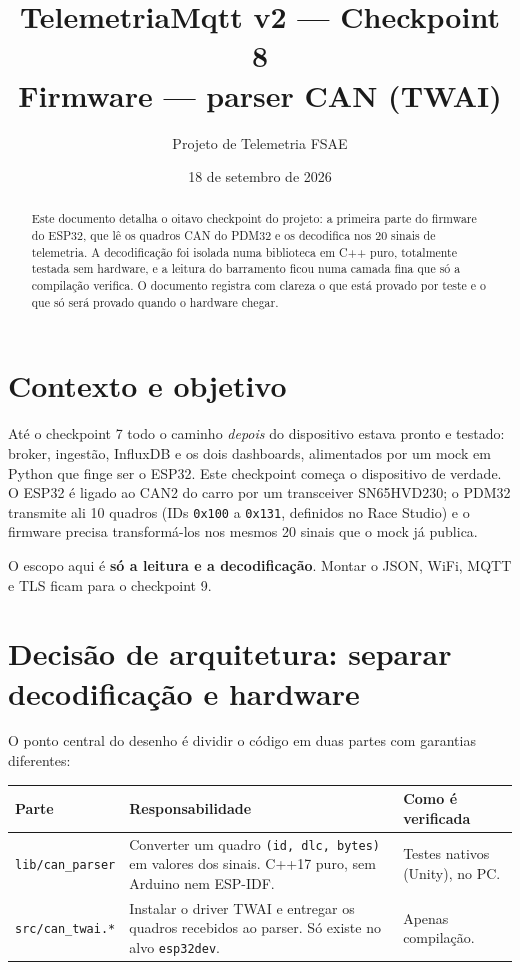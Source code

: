 \documentclass[11pt,a4paper]{article}
\title{\textbf{TelemetriaMqtt v2 --- Checkpoint 8} \\[4pt]
\large Firmware --- parser CAN (TWAI)}
\author{Projeto de Telemetria FSAE}
\date{18 de setembro de 2026}
\begin{document}
\maketitle

\begin{abstract}
\noindent Este documento detalha o oitavo checkpoint do projeto: a primeira parte do firmware do ESP32, que lê os quadros CAN do PDM32 e os decodifica nos 20 sinais de telemetria. A decodificação foi isolada numa biblioteca em C++ puro, totalmente testada sem hardware, e a leitura do barramento ficou numa camada fina que só a compilação verifica. O documento registra com clareza o que está provado por teste e o que só será provado quando o hardware chegar.
\end{abstract}

\tableofcontents

\section{Contexto e objetivo}

Até o checkpoint 7 todo o caminho \emph{depois} do dispositivo estava pronto e testado: broker, ingestão, InfluxDB e os dois dashboards, alimentados por um mock em Python que finge ser o ESP32. Este checkpoint começa o dispositivo de verdade. O ESP32 é ligado ao CAN2 do carro por um transceiver SN65HVD230; o PDM32 transmite ali 10 quadros (IDs \texttt{0x100} a \texttt{0x131}, definidos no Race Studio) e o firmware precisa transformá-los nos mesmos 20 sinais que o mock já publica.

O escopo aqui é \textbf{só a leitura e a decodificação}. Montar o JSON, WiFi, MQTT e TLS ficam para o checkpoint 9.

\section{Decisão de arquitetura: separar decodificação e hardware}

O ponto central do desenho é dividir o código em duas partes com garantias diferentes:

\begin{center}
\begin{tabularx}{\textwidth}{lXl}
\toprule
\textbf{Parte} & \textbf{Responsabilidade} & \textbf{Como é verificada} \\
\midrule
\texttt{lib/can\_parser} & Converter um quadro \texttt{(id, dlc, bytes)} em valores dos sinais. C++17 puro, sem Arduino nem ESP-IDF. & Testes nativos (Unity), no PC. \\
\texttt{src/can\_twai.*} & Instalar o driver TWAI e entregar os quadros recebidos ao parser. Só existe no alvo \texttt{esp32dev}. & Apenas compilação. \\
\bottomrule
\end{tabularx}
\end{center}
\end{document}
